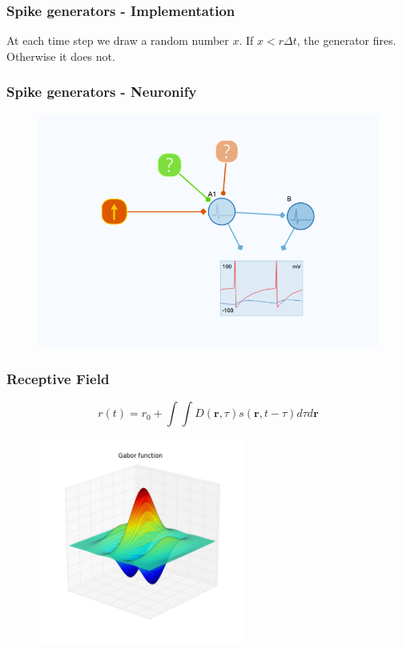 \documentclass{beamer}
\begin{document}
\begin{frame}
	\frametitle{Spike generators - Implementation}
	At each time step we draw a random number $x$. If $x<r\Delta t$, the generator fires. Otherwise it does not. 
\end{frame}

\begin{frame}
	\frametitle{Spike generators - Neuronify}
	\begin{figure}
		\includegraphics[width = \textwidth]{figures/two_neurons_noise.png}
	\end{figure}
\end{frame}





\begin{frame}
 \frametitle{Receptive Field}


\begin{equation}
r(t) = r_0 + \displaystyle \int \int D(\mathbf{r},\tau) s(\mathbf{r},t-\tau) d\tau d\mathbf{r}
\end{equation}


\begin{figure}
 \includegraphics[width = 0.6\textwidth]{figures/gabor.png}
 \end{figure}

\end{frame}
\end{document}
